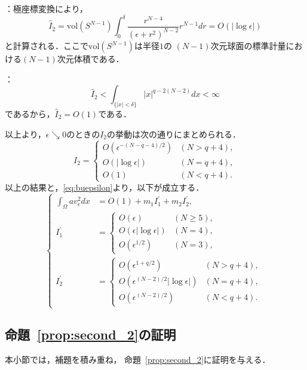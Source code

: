 ：極座標変換により，
\[
 \hat{I}_2 = \mathrm{vol}(S^{N-1}) \int_0^{\delta} \frac{
 r^{N-4}}{(\epsilon + r^2)^{N-2}} r^{N-1} dr =
 O(\lvert \log \epsilon \rvert)
\]
と計算される．ここで$ \mathrm{vol}(S^{N-1})$は半径$1$の
$(N-1)$次元球面の標準計量における$(N-1)$次元体積である．

：
\[
 \hat{I}_2 < \int_{ \{ \lvert x \rvert < \delta \}} \lvert x \rvert^{q -
 2(N-2)} dx < \infty
\]
であるから，$\hat{I}_2 = O(1)$である．

以上より，$\epsilon \searrow 0$のときの$I_2$の挙動は次の通りにまとめられる．
\[
 I_2 = \begin{cases}
        O(\epsilon^{-(N-q-4)/2}) & (N > q + 4),\\
        O(\lvert \log \epsilon \rvert) & (N = q + 4), \\ 
        O(1) & (N < q + 4).
       \end{cases}
\]
以上の結果と，\eqref{eq:buepsilon}より，以下が成立する．
\begin{equation}
 \left\{ 
 \begin{aligned}
  \int_\Omega a v_\epsilon^2 dx &= O(1) + m_1 I_1^\prime + m_2
  I_2^\prime, \\
  I_1^\prime &= \begin{cases}
                 O(\epsilon) & (N \geq 5), \\
                 O(\epsilon \lvert \log \epsilon \rvert) & (N = 4), \\
                 O(\epsilon^{1/2}) & (N = 3),
                \end{cases} \\
  I_2^\prime &= \begin{cases}
                 O(\epsilon^{1 + q/2 }) & (N > q + 4), \\
                 O(\epsilon^{(N-2)/2} \lvert \log \epsilon \rvert) & (N =
                 q + 4), \\
                 O(\epsilon^{(N-2)/2}) & (N < q + 4).
                \end{cases}
 \end{aligned} \right. \label{eq:av_epsilon}
\end{equation}

\subsection{命題~\ref{prop:second_2}の証明}

本小節では，補題を積み重ね，
命題~\ref{prop:second_2}に証明を与える．

